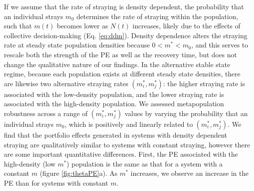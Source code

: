 \documentclass[twocolumn,preprintnumbers,amsmath,amssymb,superscriptaddress]{revtex4}
\begin{document}
If we assume that the rate of straying is density dependent, the probability that an individual strays $m_0$ determines the rate of straying within the population, such that $m(t)$ becomes lower as $N(t)$ increases, likely due to the effects of collective decision-making \cite{Berdahl:2016dx} (Eq. \ref{eq:ddm}).
Density dependence alters the straying rate at steady state population densities because $0 < m^* < m_0$, and this serves to rescale both the strength of the PE as well as the recovery time, but does not change the qualitative nature of our findings.
In the alternative stable state regime, because each population exists at different steady state densities, there are likewise two alternative straying rates $(m_i^*,m_j^*)$: the higher straying rate is associated with the low-density population, and the lower straying rate is associated with the high-density population.
We assessed metapopulation robustness across a range of $(m_i^*,m_j^*)$ values by varying the probability that an individual strays $m_0$, which is positively and linearly related to $(m_i^*,m_j^*)$.
We find that the portfolio effects generated in systems with density dependent straying are qualitatively similar to systems with constant straying, however there are some important quantitative differences.
First, the PE associated with the high-density (low $m^*$) population is the same as that for a system with a constant $m$ (figure \ref{fig:thetaPE}a).
As $m^*$ increases, we observe an increase in the PE than for systems with constant $m$.
\end{document}
